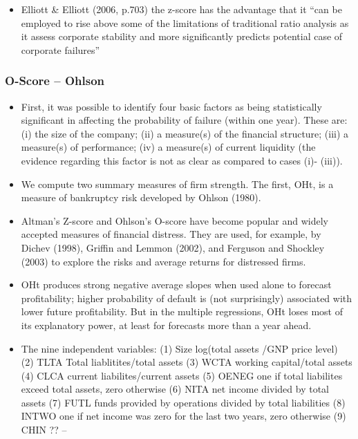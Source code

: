 \documentclass[12pt]{article}
\begin{document}
\begin{itemize}
        \item Elliott \& Elliott (2006, p.703) the z-score has the advantage that it “can be employed to rise above some of the limitations of traditional ratio analysis as it assess corporate stability and more significantly predicts potential case of corporate failures” \citep{Kleinert2014}
    \end{itemize}


    \subsubsection{O-Score -- Ohlson}

    \begin{itemize}
        \item First, it was possible to identify four basic factors as being statistically significant in affecting the probability of failure (within one year). These are: (i) the size of the company; (ii) a measure(s) of the financial structure; (iii) a measure(s) of performance; (iv) a measure(s) of current liquidity (the evidence regarding this factor is not as clear as compared to cases (i)- (iii)). \citep{Ohlson1980}
        \item  We compute two summary measures of firm strength. The first, OHt, is a measure of bankruptcy risk developed by Ohlson (1980).\citep{Fama2006}

        \item Altman’s Z-score and Ohlson’s O-score have become popular and widely accepted measures of financial distress. They are used, for example, by Dichev (1998), Griffin and Lemmon (2002), and Ferguson and Shockley (2003) to explore the risks and average returns for distressed firms. \citep{Campbell2008}

        \item OHt produces strong negative average slopes when used alone to forecast profitability; higher probability of default is (not surprisingly) associated with lower future profitability. But in the multiple regressions, OHt loses most of its explanatory power, at least for forecasts more than a year ahead. \citep{Fama2006}

        \item The nine independent variables: (1) Size log(total assets /GNP price level) (2) TLTA Total liablitites/total assets (3) WCTA working capital/total assets (4) CLCA current liabilites/current assets (5) OENEG one if total liabilites exceed total assets, zero otherwise (6) NITA net income divided by total assets (7) FUTL funds provided by operations divided by total liabilities (8) INTWO one if net income was zero for the last two years, zero otherwise (9) CHIN ??  -- 

    \end{itemize}
\end{document}
